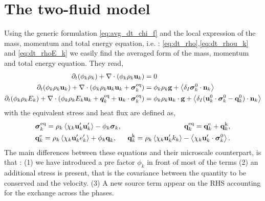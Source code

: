 \section{The two-fluid model}
\label{ap:two-fluid_model}

Using the generic formulation \ref{eq:avg_dt_chi_f} and the local expression of the mass, momentum and total energy equation, i.e. : \ref{eq:dt_rho},\ref{eq:dt_rhou_k} and \ref{eq:dt_rhoE_k} we easily find the averaged form of the mass, momentum and total energy equation.
They read, 
\begin{align}
    \label{eq:dt_avg_rho}
    \partial_t (\phi_k \rho_k)  
    + \mathbf{\nabla}\cdot (
        \phi_k \rho_k\textbf{u}_k
    )
    &= 
    0\\
    \label{eq:dt_avg_rhou_k}
    \partial_t (\phi_k \rho_k\textbf{u}_k)  
    + \mathbf{\nabla}\cdot (
        \phi_k \rho_k\textbf{u}_k\textbf{u}_k
        + \bm{\sigma}_k^\text{eq}
    )
    &= 
    \phi_k \rho_k \textbf{g} 
    +  \left<\delta_I \bm{\sigma}_k^0 \cdot \textbf{n}_k\right>\\
    \label{eq:dt_avg_rhoE_k}
    \partial_t (\phi_k\rho_kE_k)  
    + \mathbf{\nabla}\cdot (
        \phi_k\rho_kE_k\textbf{u}_k
        + \bm{q}_k^\text{eq}
        + \textbf{u}_k \cdot \bm{\sigma}_k^\text{eq}
        )
    &= 
    \phi_k \rho_k\textbf{u}_k \cdot \textbf{g} 
    + \left<\delta_I (\textbf{u}_k^0 \cdot \bm{\sigma}_k^0 - \textbf{q}_k^0)\cdot \textbf{n}_k\right>
\end{align} 
with the equivalent stress and heat flux are defined as, 
\begin{align*}
    &\bm{\sigma}_k^\text{eq}
    = 
     \rho_k\avg{\chi_k \textbf{u}_k'\textbf{u}_k'}
      - \phi_k \bm{\sigma}_k,%
    &\textbf{q}_k^\text{eq}
    =\textbf{q}_k^\text{e} +\textbf{q}_k^\text{k},  \\
    &\textbf{q}_k^\text{e}
    = \rho_k \avg{\chi_k\textbf{u}_k' e_k'} 
    + \phi_k\textbf{q}_k,
    &\textbf{q}_k^\text{k}
    = \rho_k \avg{\chi_k \textbf{u}_k' k_k} 
    - \avg{\chi_k \textbf{u}_k' \cdot \bm{\sigma}_k^0}.
\end{align*}
The main differences between these equations and their microscale counterpart, is that : (1) we have introduced a pre factor $\phi_k$ in front of most of the terms
(2) an additional stress is present, that is the covariance between the quantity to be conserved and the velocity. 
(3) A new source term appear on the RHS accounting for the exchange across the phases. 

